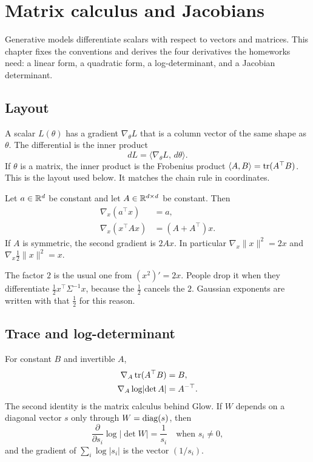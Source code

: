 \chapter{Matrix calculus and Jacobians}
\label{ch:calc}

Generative models differentiate scalars with respect to vectors and matrices. This chapter fixes the conventions and derives the four derivatives the homeworks need: a linear form, a quadratic form, a log-determinant, and a Jacobian determinant.

\section{Layout}

A scalar $L(\theta)$ has a gradient $\nabla_\theta L$ that is a column vector of the same shape as $\theta$. The differential is the inner product
\[
dL=\langle \nabla_\theta L,\, d\theta\rangle.
\]
If $\theta$ is a matrix, the inner product is the Frobenius product $\langle A,B\rangle=\operatorname{tr}(A^\top B)$. This is the layout used below. It matches the chain rule in coordinates.

\begin{resultbox}
Let $a\in\mathbb{R}^d$ be constant and let $A\in\mathbb{R}^{d\times d}$ be constant. Then
\begin{align*}
\nabla_x (a^\top x)&=a,\\
\nabla_x (x^\top A x)&=(A+A^\top)x.
\end{align*}
If $A$ is symmetric, the second gradient is $2Ax$. In particular $\nabla_x \|x\|^2=2x$ and $\nabla_x \tfrac12\|x\|^2=x$.
\end{resultbox}

\begin{intbox}
The factor $2$ is the usual one from $(x^2)'=2x$. People drop it when they differentiate $\tfrac12 x^\top \Sigma^{-1}x$, because the $\tfrac12$ cancels the $2$. Gaussian exponents are written with that $\tfrac12$ for this reason.
\end{intbox}

\section{Trace and log-determinant}

\begin{resultbox}
For constant $B$ and invertible $A$,
\begin{align*}
\nabla_A \operatorname{tr}(A^\top B)&=B,\\
\nabla_A \log\lvert\det A\rvert&=A^{-\top}.
\end{align*}
The second identity is the matrix calculus behind Glow. If $W$ depends on a diagonal vector $s$ only through $W=\operatorname{diag}(s)$, then
\[
\frac{\partial}{\partial s_i}\log\lvert\det W\rvert=\frac{1}{s_i}
\quad\text{when }s_i\neq 0,
\]
and the gradient of $\sum_i\log\lvert s_i\rvert$ is the vector $(1/s_i)$.
\end{resultbox}

